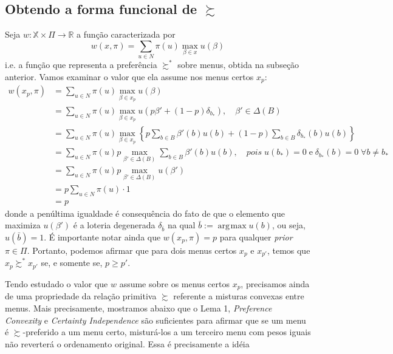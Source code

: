 \documentclass[11pt, a4paper]{article}
\theoremstyle{nonumberplain}
\theoremstyle{plain}
\theoremstyle{plain}
\theoremstyle{plain}
\DeclareMathOperator*{\argmax}{\arg\!\max}
\begin{document}
\subsection{Obtendo a forma funcional de $\succsim$}
Seja $w:\mathbb{X}\times \Pi\rightarrow \mathbb{R}$ a função caracterizada por $$w(x,\pi)=\sum_{u\in N} \pi(u)\max_{\beta\in x}u(\beta)$$ i.e. a função que representa a preferência $\succsim^*$ sobre menus, obtida na subseção anterior. Vamos examinar o valor que ela assume nos menus certos $x_p$:
\begin{align*}
w(x_p,\pi)&=\sum_{u\in N} \pi(u)\max_{\beta\in x_{p}}u(\beta)\\
&= \sum_{u\in N} \pi(u)\max_{\beta\in x_{p}}u(p\beta'+(1-p)\delta_{b_*}),\quad \beta'\in \Delta(B)\\
&=\sum_{u\in N} \pi(u)\max_{\beta\in x_{p}}\left\lbrace p \sum_{b\in B}\beta'(b)u(b)+(1-p)\sum_{b\in B}\delta_{b_*}(b)u(b)\right\rbrace \\
&=\sum_{u\in N} \pi(u)p\max_{\beta'\in \Delta(B)}\sum_{b\in B}\beta'(b)u(b), \quad pois \; u(b_*)=0\; \text{e}\; \delta_{b_*}(b)=0\; \forall b\neq b_*\\
&= \sum_{u\in N} \pi(u) p \max_{\beta'\in \Delta(B)} u(\beta')\\
&= p\sum_{u\in N}\pi(u)\cdot 1\\
&=p
\end{align*}
donde a penúltima igualdade é consequência do fato de que o elemento que maximiza $u(\beta')$ é a loteria degenerada $\delta_{\bar{b}}$ na qual $\bar{b}:=\argmax u(b)$, ou seja, $u(\bar{b})=1$. É importante notar ainda que $w(x_p,\pi)=p$ para qualquer \textit{prior} $\pi\in\Pi$. Portanto, podemos afirmar que para dois menus certos $x_p$ e $x_{p'}$, temos que $x_p\succsim^* x_{p'}$ se, e somente se, $p\geq p'$. 

Tendo estudado o valor que $w$ assume sobre os menus certos $x_p$, precisamos ainda de uma propriedade da relação primitiva $\succsim$ referente a misturas convexas entre menus. Mais precisamente, mostramos abaixo que o Lema 1, \emph{Preference Convexity} e \emph{Certainty Independence} são suficientes para afirmar que se um menu é $\succsim$-preferido a um menu certo, misturá-los a um terceiro menu com pesos iguais não reverterá o ordenamento original. Essa é precisamente a idéia  
\end{document}
